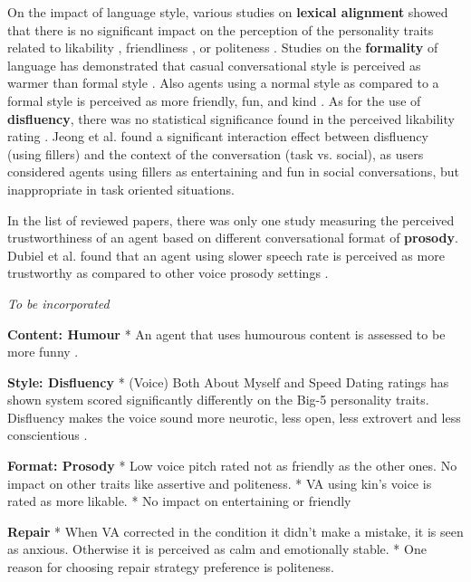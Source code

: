 \documentclass[sigconf,screen,review, anonymous]{acmart}
\newcommand{\cmt}[1]{}%
\begin{document}
On the impact of language style, various studies on \textbf{lexical alignment} showed that there is no significant impact on the perception of the personality traits related to likability \cite{huiyang2022improving}\cmt{[17]}\cite{linnemann2018can}\cmt{[15]}, friendliness \cite{spillner2021talk}\cmt{[18]}, or politeness \cite{spillner2021talk}\cmt{[18]}. Studies on the \textbf{formality} of language has demonstrated that casual conversational style is perceived as warmer than formal style \cite{cox2022does}\cmt{[27]}. Also agents using a normal style as compared to a formal style is perceived as more friendly, fun, and kind \cite{ouchi2019should}\cmt{[59]}. As for the use of \textbf{disfluency}, there was no statistical significance found in the perceived likability rating \cite{jeong2019exploring}\cmt{[10]}\cite{pfeifer2009should}\cmt{[12]}. Jeong et al. \cite{jeong2019exploring} found a significant interaction effect between disfluency (using fillers) and the context of the conversation (task vs. social), as users considered agents using fillers as entertaining and fun in social conversations, but inappropriate in task oriented situations.

In the list of reviewed papers, there was only one study measuring the perceived trustworthiness of an agent based on different conversational format of \textbf{prosody}. Dubiel et al. found that an agent using slower speech rate is perceived as more trustworthy as compared to other voice prosody settings \cite{dubiel2020persuasive}\cmt{[60]}.

\textit{To be incorporated}

\textbf{Content: Humour}
* An agent that uses humourous content is assessed to be more funny \cite{khooshabeh2011does}\cmt{[37]}.

\textbf{Style: Disfluency}
* (Voice) Both About Myself and Speed Dating ratings has shown system scored significantly differently on the Big-5 personality traits. Disfluency makes the voice sound more neurotic, less open, less extrovert and less conscientious \cite{wester2015artificial}\cmt{[14]}.

\textbf{Format: Prosody}
* Low voice pitch rated not as friendly as the other ones. No impact on other traits like assertive and politeness. \cite{tolmeijer2021female}\cmt{[62]}
* VA using kin's voice is rated as more likable. \cite{chan2021kinvoices}\cmt{[74]}
* No impact on entertaining or friendly  \cite{jestin2022effects}\cmt{[81]}

\textbf{Repair}
* When VA corrected in the condition it didn't make a mistake, it is seen as anxious. Otherwise it is perceived as calm and emotionally stable. \cite{cuadra2021my}\cmt{[67]}
* One reason for choosing repair strategy preference is politeness. \cite{ashktorab2019resilient}\cmt{[88]}
\end{document}
